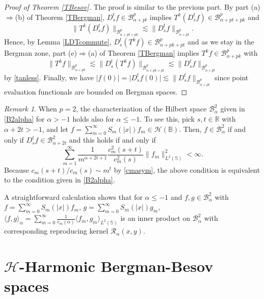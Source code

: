 \documentclass{amsart}
\theoremstyle{definition}
\theoremstyle{remark}
\newtheorem{remark}[theorem]{Remark}
\begin{document}
\begin{proof}[Proof of Theorem \ref{TBesov}]
The proof is similar to the previous part.
By part (a)$\Rightarrow$(b) of Theorem \ref{TBergman},
$D^t_s f\in\mathcal B^p_{\alpha+pt}$ implies
$T^k(D^t_s f)\in\mathcal B^p_{\alpha+pt+pk}$
and
\begin{equation}\label{tanless}
\|T^k(D^t_s f)\|_{\mathcal B^p_{\alpha+pt+pk}}
\lesssim \|D^t_s f\|_{\mathcal B^p_{\alpha+pt}}.
\end{equation}
Hence, by Lemma \ref{LDTcommute},
$D^t_s(T^k f)\in\mathcal B^p_{\alpha+pk+pt}$
and as we stay in the Bergman zone,
part (e)$\Rightarrow$(a) of Theorem \ref{TBergman} implies
$T^k f\in\mathcal B^p_{\alpha+pk}$ with
\begin{equation*}
\|T^k f\|_{\mathcal B^p_{\alpha+pk}}
\lesssim \|D^t_s(T^k f)\|_{\mathcal B^p_{\alpha+pk+pt}}
\lesssim \|D^t_s f\|_{\mathcal B^p_{\alpha+pt}}
\end{equation*}
by \eqref{tanless}.
Finally, we have $\vert f(0)\vert=\vert D^t_s f(0)\vert
\lesssim \|D^t_s f\|_{\mathcal B^p_{\alpha+pt}}$
since point evaluation functionals are bounded on Bergman spaces.
\end{proof}

\begin{remark}\label{Rp2}
When $p=2$, the characterization of the Hilbert space $\mathcal B^2_\alpha$
given in \eqref{B2alpha} for $\alpha>-1$ holds also for $\alpha\le -1$.
To see this, pick $s,t\in\mathbb R$ with $\alpha+2t>-1$, and let
$f=\sum_{m=0}^\infty S_m(\vert x\vert)f_m\in\mathcal H(\mathbb B)$.
Then, $f\in\mathcal B^2_\alpha$ if and only if
$D^t_s f\in\mathcal B^2_{\alpha+2t}$ and this holds if and only if
\begin{equation*}
\sum_{m=1}^\infty\frac{1}{m^{\alpha+2t+1}}\frac{c_m^2(s+t)}{c_m^2(s)}
\|f_m\|^2_{L^2(\mathbb S)}<\infty.
\end{equation*}
Because $c_m(s+t)/c_m(s)\sim m^t$ by \eqref{cmasym}, the above condition
is equivalent to the condition given in \eqref{B2alpha}.

A straightforward calculation shows that for $\alpha\leq -1$ and
$f,g\in\mathcal B^2_\alpha$ with $f=\sum_{m=0}^\infty S_m(\vert x\vert)f_m$,
$g=\sum_{m=0}^\infty S_m(\vert x\vert)g_m$,
$\langle f,g\rangle_{\alpha}
=\sum_{m=0}^\infty\frac{1}{c_m(\alpha)}\langle f_m,g_m\rangle_{L^2(\mathbb S)}$
is an inner product on  $\mathcal B^2_\alpha$ with corresponding
reproducing kernel $\mathcal R_{\alpha}(x,y)$.
\end{remark}

%
\section{$\mathcal H$-Harmonic Bergman-Besov spaces}
%
\end{document}
